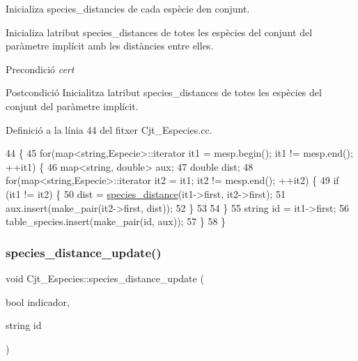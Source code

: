 Inicializa species\+\_\+distancies de cada espècie d\textquotesingle{}en conjunt. 

Inicializa l\textquotesingle{}atribut species\+\_\+distances de totes les espècies del conjunt del paràmetre implícit amb les distàncies entre elles.

\begin{DoxyPrecond}{Precondició}
{\itshape cert} 
\end{DoxyPrecond}
\begin{DoxyPostcond}{Postcondició}
Inicialitza l\textquotesingle{}atribut species\+\_\+distances de totes les espècies del conjunt del paràmetre implícit. 
\end{DoxyPostcond}


Definició a la línia 44 del fitxer Cjt\+\_\+\+Especies.\+cc.


\begin{DoxyCode}
44                                         \{
45     \textcolor{keywordflow}{for}(map<string,Especie>::iterator it1 = mesp.begin(); it1 != mesp.end(); ++it1) \{
46         map<string, double> aux;
47         \textcolor{keywordtype}{double} dist;
48         \textcolor{keywordflow}{for}(map<string,Especie>::iterator it2 = it1; it2 != mesp.end(); ++it2) \{
49             \textcolor{keywordflow}{if} (it1 != it2) \{
50                 dist = \hyperlink{class_cjt___especies_abf55093b325fd101ef73aa18dd1cf823}{species\_distance}(it1->first, it2->first);
51                 aux.insert(make\_pair(it2->first, dist));
52             \}
53             
54         \}
55         \textcolor{keywordtype}{string} \textcolor{keywordtype}{id} = it1->first;
56         table\_species.insert(make\_pair(\textcolor{keywordtype}{id}, aux));
57     \}
58 \}
\end{DoxyCode}
\mbox{\label{class_cjt___especies_a043f6ce127ac78eb891f6d004eee40b0}} 
\subsubsection{\texorpdfstring{species\+\_\+distance\+\_\+update()}{species\_distance\_update()}}
{\footnotesize\ttfamily void Cjt\+\_\+\+Especies\+::species\+\_\+distance\+\_\+update (\begin{DoxyParamCaption}\item[{bool}]{indicador,  }\item[{string}]{id }\end{DoxyParamCaption})}



